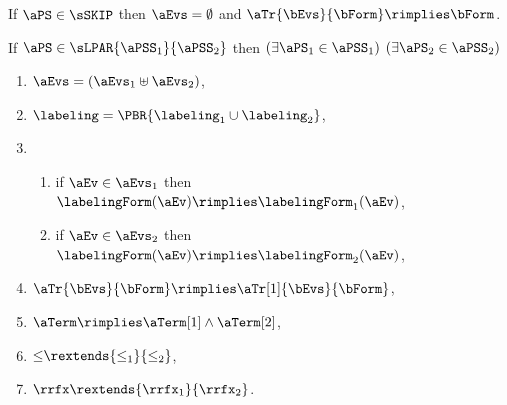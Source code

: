 \begin{definition}
  \noindent
  If $\aPS\in\sSKIP$ then $\aEvs = \emptyset$ and
  $\aTr{\bEvs}{\bForm} \rimplies \bForm$.

  \noindent
  If $\aPS \in \sLPAR{\aPSS_1}{\aPSS_2}$ then  
  $(\exists\aPS_1\in\aPSS_1)$ $(\exists\aPS_2\in\aPSS_2)$
  \begin{multicols}{2}
    \begin{enumerate}[topsep=0pt,label=(\textsc{p}\arabic*),ref=\textsc{p}\arabic*]
    \item \label{par-E}
      $\aEvs = (\aEvs_1\uplus\aEvs_2)$,
    \item \label{par-lambda}
      ${\labeling}=\PBR{{\labeling_1}\cup {\labeling_2}}$, 
    \item[] 
      \begin{enumerate}[leftmargin=0pt]
      \item \label{par-kappa1}
        if $\aEv\in\aEvs_1$ then $\labelingForm(\aEv) \rimplies \labelingForm_1(\aEv)$,
      \item \label{par-kappa2}
        if $\aEv\in\aEvs_2$ then $\labelingForm(\aEv) \rimplies \labelingForm_2(\aEv)$,
      \end{enumerate}
    \item \label{par-tau}
      $\aTr{\bEvs}{\bForm} \rimplies \aTr[1]{\bEvs}{\bForm}$,
    \item \label{par-term}
      $\aTerm \rimplies \aTerm[1]\land\aTerm[2]$,
    \item \label{par-le-extends}
      ${\le}\rextends{\le_1}{\le_2}$, 
    \item \label{par-rf}
      ${\rrfx}\rextends{\rrfx_1}{\rrfx_2}$.
    \end{enumerate}
  \end{multicols}
  \medskip


\end{definition}
